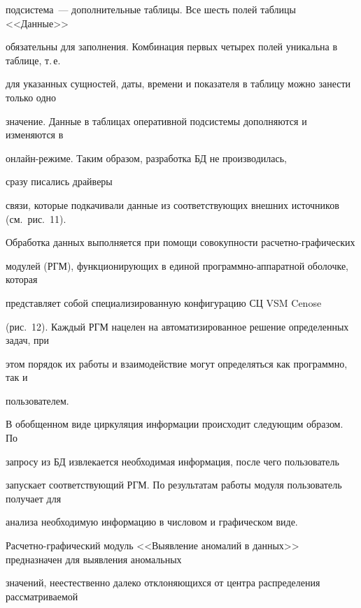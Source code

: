 под\-сис\-те\-ма~--- дополнительные таб\-ли\-цы. Все шесть полей таб\-ли\-цы <<Данные>> 


обязательны для заполнения. Комбинация первых четырех полей уникальна в таблице, т.\,е.\ 


для указанных сущностей, даты, времени и показателя в таб\-ли\-цу можно занести только одно 


значение. Данные в таб\-ли\-цах оперативной под\-сис\-те\-мы дополняются и изменяются в 


он\-лайн-ре\-жи\-ме. Таким образом, разработка БД не производилась, 


сразу писались драйверы 


связи, которые подкачивали данные из соответствующих внешних источников (см.\ рис.~11).





   


      


      Обработка данных выполняется при помощи совокупности рас\-чет\-но-гра\-фи\-че\-ских 


модулей (РГМ), функционирующих в единой про\-грам\-мно-ап\-па\-рат\-ной оболочке, которая 


представляет собой специализированную конфигурацию СЦ VSM Cenose 


(рис.~12). Каждый РГМ нацелен на автоматизированное решение определенных задач, при 


этом порядок их работы и взаимодействие могут определяться как программно, так и 


пользователем.


      


      В обобщенном виде циркуляция информации происходит следующим образом. По 


запросу из БД извлекается необходимая информация, после чего пользователь 


запускает соответствующий РГМ. По результатам работы модуля пользователь получает для 


анализа необходимую информацию в числовом и графическом виде. 


      


      Расчетно-графический модуль <<Выявление аномалий в данных>> предназначен для выявления аномальных 


значений, неестественно далеко отклоняющихся от центра распределения рассматриваемой 


